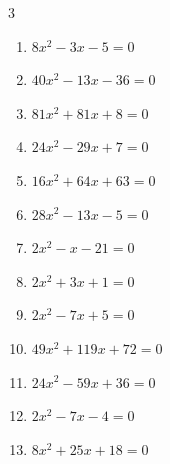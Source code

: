 \begin{multicols}{3}
\begin{enumerate}
  \item $8x^{2}-3x-5=0$


  \item $40x^{2}-13x-36=0$


  \item $81x^{2}+81x+8=0$


  \item $24x^{2}-29x+7=0$


  \item $16x^{2}+64x+63=0$


  \item $28x^{2}-13x-5=0$


  \item $2x^{2}-x-21=0$


  \item $2x^{2}+3x+1=0$


  \item $2x^{2}-7x+5=0$


\columnbreak %

  \item $49x^{2}+119x+72=0$


  \item $24x^{2}-59x+36=0$


  \item $2x^{2}-7x-4=0$


  \item $8x^{2}+25x+18=0$


\end{enumerate}
\end{multicols}
